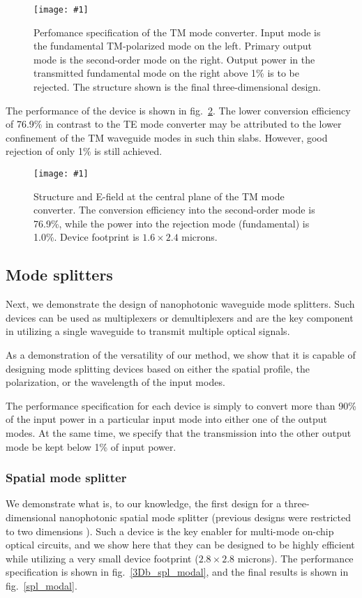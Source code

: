 \documentclass[letterpaper,10pt]{article}
\newcommand{\myfig}[2]{
    \begin{figure}[!h]
    \begin{centering}
    \texttt{[image: \#1]}
    \caption{#2}\label{#1}
    \end{centering}
    \end{figure}
}
\newcommand{\fig}[1]{fig.~\ref{#1}}
\begin{document}
\myfig{3Db_wgc_tm}
    {Perfomance specification of the TM mode converter.
    Input mode is the fundamental TM-polarized mode on the left.
    Primary output mode is the second-order mode on the right.
    Output power in the transmitted fundamental mode on the right 
    above 1\% is to be rejected.
    The structure shown is the final three-dimensional design.}
    
The performance of the device is shown in \fig{wgc_tm}.
The lower conversion efficiency of 76.9\% in contrast to the TE mode converter
    may be attributed to the lower confinement of the TM waveguide modes 
    in such thin slabs.
However, good rejection of only 1\% is still achieved.

\myfig{wgc_tm}
    {Structure and E-field at the central plane of the TM mode converter.
    The conversion efficiency into the second-order mode is 76.9\%,
    while the power into the rejection mode (fundamental) is 1.0\%.
    Device footprint is $1.6\times2.4$ microns.}

\subsection{Mode splitters}
Next, we demonstrate the design of nanophotonic waveguide mode splitters.
Such devices can be used as multiplexers or demultiplexers and
    are the key component in utilizing a single waveguide to transmit 
    multiple optical signals.

As a demonstration of the versatility of our method, 
    we show that it is capable of designing mode splitting devices 
    based on either the spatial profile, the polarization, or the wavelength
    of the input modes.

The performance specification for each device is simply to convert
    more than 90\% of the input power in a particular input mode into
    either one of the output modes.
At the same time, we specify that the transmission into the other output mode 
    be kept below 1\% of input power.

\subsubsection{Spatial mode splitter}
We demonstrate what is, to our knowledge, 
    the first design for a three-dimensional
    nanophotonic spatial mode splitter 
    (previous designs were restricted to two dimensions \cite{2dsplitter}).
Such a device is the key enabler for multi-mode on-chip optical circuits,
    and we show here that they can be designed to be highly efficient
    while utilizing a very small device footprint ($2.8\times2.8$ microns). 
The performance specification is shown in \fig{3Db_spl_modal},
    and the final results is shown in \fig{spl_modal}.
\end{document}
